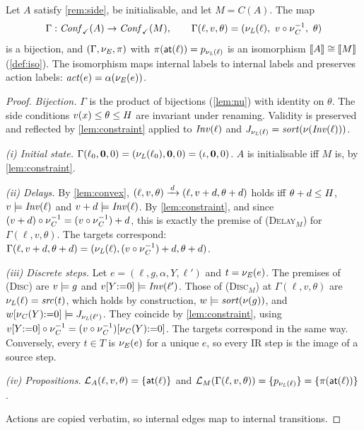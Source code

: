 \begin{theorem}\label{thm:compiler}
Let $A$ satisfy \cref{rem:side}, be initialisable, and let $M=C(A)$. The map
\[
  \Gamma:\Valid(A)\to\Valid(M),\qquad
  \Gamma(\ell,v,\theta)=(\nu_\Loc(\ell),\ v\circ\nu_\Clk^{-1},\ \theta)
\]
is a bijection, and $(\Gamma,\nu_{\mathit{E}},\pi)$ with $\pi(\mathsf{at}(\ell))=p_{\nu_{\mathit{L}}(\ell)}$ is an
isomorphism $\llbracket A \rrbracket\cong\llbracket M \rrbracket$ (\cref{def:iso}). The isomorphism maps internal
labels to internal labels and preserves action labels:
$\mathit{act}(e)=\alpha(\nu_{\mathit{E}}(e))$.
\end{theorem}
\begin{proof}
\emph{Bijection.} $\Gamma$ is the product of bijections (\cref{lem:nu}) with
identity on $\theta$. The side conditions $v(x)\le\theta\le H$ are
invariant under renaming. Validity is preserved and reflected by
\cref{lem:constraint} applied to $\mathit{Inv}(\ell)$ and $J_{\nu_{\mathit{L}}(\ell)}=\mathit{sort}(\nu(\mathit{Inv}(\ell)))$.

\emph{(i) Initial state.} $\Gamma(\ell_0,\mathbf{0},0)=(\nu_{\mathit{L}}(\ell_0),\mathbf{0},0)=(\iota,\mathbf{0},0)$.
$A$ is initialisable iff $M$ is, by \cref{lem:constraint}.

\emph{(ii) Delays.} By \cref{lem:convex}, $(\ell,v,\theta)\xrightarrow{\,d\,}(\ell,v+d,\theta+d)$
holds iff $\theta+d\le H$, $v\models\mathit{Inv}(\ell)$ and $v+d\models\mathit{Inv}(\ell)$. By
\cref{lem:constraint}, and since $(v+d)\circ\nu_{\mathit{C}}^{-1}=(v\circ\nu_{\mathit{C}}^{-1})+d$, this
is exactly the premise of \textsc{(Delay$_M$)} for $\Gamma(\ell,v,\theta)$. The targets
correspond: $\Gamma(\ell,v+d,\theta+d)=(\nu_{\mathit{L}}(\ell),(v\circ\nu_{\mathit{C}}^{-1})+d,\theta+d)$.

\emph{(iii) Discrete steps.} Let $e=(\ell,g,\alpha,Y,\ell')$ and $t=\nu_{\mathit{E}}(e)$.
The premises of \textsc{(Disc)} are $v\models g$ and $v[Y{:=}0]\models\mathit{Inv}(\ell')$. Those of
\textsc{(Disc$_M$)} at $\Gamma(\ell,v,\theta)$ are $\nu_{\mathit{L}}(\ell)=\mathit{src}(t)$, which holds
by construction, $w\models\mathit{sort}(\nu(g))$, and $w[\nu_{\mathit{C}}(Y){:=}0]\models J_{\nu_{\mathit{L}}(\ell')}$.
They coincide by \cref{lem:constraint}, using
$v[Y{:=}0]\circ\nu_{\mathit{C}}^{-1}=(v\circ\nu_{\mathit{C}}^{-1})[\nu_{\mathit{C}}(Y){:=}0]$. The targets
correspond in the same way. Conversely, every $t\in T$ is $\nu_{\mathit{E}}(e)$ for a
unique $e$, so every IR step is the image of a source step.

\emph{(iv) Propositions.} $\mathcal{L}_A(\ell,v,\theta)=\{\mathsf{at}(\ell)\}$ and
$\mathcal{L}_M(\Gamma(\ell,v,\theta))=\{p_{\nu_{\mathit{L}}(\ell)}\}=\{\pi(\mathsf{at}(\ell))\}$.

Actions are copied verbatim, so internal edges map to internal transitions.
\end{proof}

